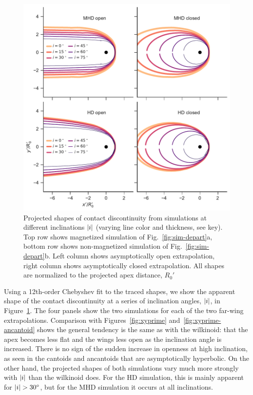 \begin{figure}
  \centering
  \includegraphics[width=\linewidth]{figs/test_xyprime_simulation}
  \caption[]{Projected shapes of contact discontinuity from
    simulations at different inclinations \(\lvert i\rvert\) (varying line
    color and thickness, see key).  Top row shows magnetized
    simulation of Fig.~\ref{fig:sim-depart}a, bottom row shows
    non-magnetized simulation of Fig.~\ref{fig:sim-depart}b.  Left
    column shows asymptotically open extrapolation, right column shows
    asymptotically closed extrapolation.  All shapes are normalized to
    the projected apex distance, \(R_0'\) }
  \label{fig:sim-xyp}
\end{figure}

Using a 12th-order Chebyshev fit to the traced shapes, we show the
apparent shape of the contact discontinuity at a series of inclination
angles, \(\lvert i\rvert\), in Figure~\ref{fig:sim-xyp}.  The four panels
show the two simulations for each of the two far-wing extrapolations.
Comparison with Figures~\ref{fig:xyprime}
and~\ref{fig:xyprime-ancantoid} shows the general tendency is the same
as with the wilkinoid: that the apex becomes less flat and the wings
less open as the inclination angle is increased.  There is no sign of
the sudden increase in openness at high inclination, as seen in the
cantoids and ancantoids that are asymptotically hyperbolic.  On the
other hand, the projected shapes of both simulations vary much more
strongly with \(\lvert i\rvert\) than the wilkinoid does.  For the HD
simulation, this is mainly apparent for \(\lvert i\rvert > \ang{30}\), but
for the MHD simulation it occurs at all inclinations.


